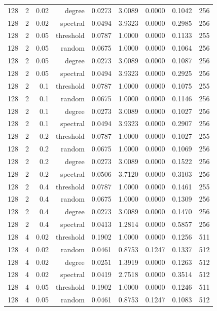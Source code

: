 \begin{table}[t]
\begin{tabular}{lrrrrrrrr}
128 & 2 & 0.02 & degree & 0.0273 & 3.0089 & 0.0000 & 0.1042 & 256 \\
128 & 2 & 0.02 & spectral & 0.0494 & 3.9323 & 0.0000 & 0.2985 & 256 \\
128 & 2 & 0.05 & threshold & 0.0787 & 1.0000 & 0.0000 & 0.1133 & 255 \\
128 & 2 & 0.05 & random & 0.0675 & 1.0000 & 0.0000 & 0.1064 & 256 \\
128 & 2 & 0.05 & degree & 0.0273 & 3.0089 & 0.0000 & 0.1087 & 256 \\
128 & 2 & 0.05 & spectral & 0.0494 & 3.9323 & 0.0000 & 0.2925 & 256 \\
128 & 2 & 0.1 & threshold & 0.0787 & 1.0000 & 0.0000 & 0.1075 & 255 \\
128 & 2 & 0.1 & random & 0.0675 & 1.0000 & 0.0000 & 0.1146 & 256 \\
128 & 2 & 0.1 & degree & 0.0273 & 3.0089 & 0.0000 & 0.1027 & 256 \\
128 & 2 & 0.1 & spectral & 0.0494 & 3.9323 & 0.0000 & 0.2907 & 256 \\
128 & 2 & 0.2 & threshold & 0.0787 & 1.0000 & 0.0000 & 0.1027 & 255 \\
128 & 2 & 0.2 & random & 0.0675 & 1.0000 & 0.0000 & 0.1069 & 256 \\
128 & 2 & 0.2 & degree & 0.0273 & 3.0089 & 0.0000 & 0.1522 & 256 \\
128 & 2 & 0.2 & spectral & 0.0506 & 3.7120 & 0.0000 & 0.3103 & 256 \\
128 & 2 & 0.4 & threshold & 0.0787 & 1.0000 & 0.0000 & 0.1461 & 255 \\
128 & 2 & 0.4 & random & 0.0675 & 1.0000 & 0.0000 & 0.1309 & 256 \\
128 & 2 & 0.4 & degree & 0.0273 & 3.0089 & 0.0000 & 0.1470 & 256 \\
128 & 2 & 0.4 & spectral & 0.0413 & 1.2814 & 0.0000 & 0.5857 & 256 \\
128 & 4 & 0.02 & threshold & 0.1902 & 1.0000 & 0.0000 & 0.1256 & 511 \\
128 & 4 & 0.02 & random & 0.0461 & 0.8753 & 0.1247 & 0.1337 & 512 \\
128 & 4 & 0.02 & degree & 0.0251 & 1.3919 & 0.0000 & 0.1263 & 512 \\
128 & 4 & 0.02 & spectral & 0.0419 & 2.7518 & 0.0000 & 0.3514 & 512 \\
128 & 4 & 0.05 & threshold & 0.1902 & 1.0000 & 0.0000 & 0.1246 & 511 \\
128 & 4 & 0.05 & random & 0.0461 & 0.8753 & 0.1247 & 0.1083 & 512 \\

\end{tabular}
\end{table}
